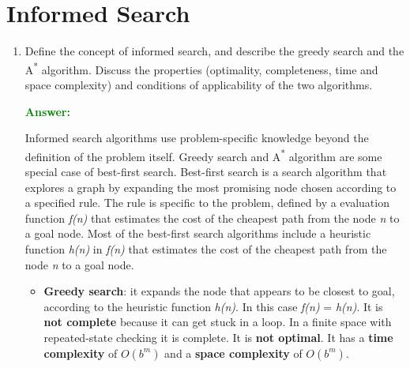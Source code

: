 \documentclass[12pt]{article}
\begin{document}
\section{Informed Search}\label{sec-informedsearch}
\begin{enumerate}[label=\textbf{IS.\arabic*}]
    \item Define the concept of informed search, and describe the greedy search and the A\textsuperscript{*} algorithm.
    Discuss the properties (optimality, completeness, time and space complexity) and conditions of applicability of the two algorithms.

    \textcolor{green}{\textbf{Answer:}}

    Informed search algorithms use problem-specific knowledge beyond the definition of the problem itself.
    Greedy search and A\textsuperscript{*} algorithm are some special case of best-first search.
    Best-first search is a search algorithm that explores a graph by expanding the most promising node chosen according to a specified rule.
    The rule is specific to the problem, defined by a evaluation function \textit{f(n)} that estimates the cost of the 
    cheapest path from the node \textit{n} to a goal node.
    Most of the best-first search algorithms include a heuristic function \textit{h(n)} in \textit{f(n)} that estimates the cost of the cheapest path from the node \textit{n} to a goal node.

    \begin{itemize}
        \item \textbf{Greedy search}: it expands the node that appears to be closest to goal, according to the heuristic function \textit{h(n)}.
        In this case \textit{f(n)} = \textit{h(n)}.
        It is \textbf{not complete} because it can get stuck in a loop. In a finite space with repeated-state checking it is complete.
        It is \textbf{not optimal}.
        It has a \textbf{time complexity} of $O(b^m)$ and a \textbf{space complexity} of $O(b^m)$.


\end{itemize}
\end{enumerate}
\end{document}
